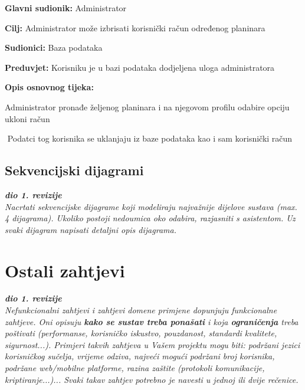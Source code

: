		\noindent {}
		\begin{packed_item}
			
			\item \textbf{Glavni sudionik: }$ $Administrator$ $
			\item  \textbf{Cilj:} $ $Administrator može izbrisati korisnički račun određenog planinara $ $
			\item  \textbf{Sudionici:} $ $Baza podataka $ $
			\item  \textbf{Preduvjet:} $ $Korisniku je u bazi podataka dodjeljena uloga administratora$ $
			\item  \textbf{Opis osnovnog tijeka:}
			
			\item[] \begin{packed_enum}
				
				\item $ $Administrator pronađe željenog planinara i na njegovom profilu odabire opciju ukloni račun$ $
				\item $ $ Podatci tog korisnika se uklanjaju iz baze podataka kao i sam korisnički račun $ $
				
				
			\end{packed_enum}
		\end{packed_item}
				
			\subsection{Sekvencijski dijagrami}
				
				\textbf{\textit{dio 1. revizije}}\\
				
				\textit{Nacrtati sekvencijske dijagrame koji modeliraju najvažnije dijelove sustava (max. 4 dijagrama). Ukoliko postoji nedoumica oko odabira, razjasniti s asistentom. Uz svaki dijagram napisati detaljni opis dijagrama.}
				\eject
	
		\section{Ostali zahtjevi}
		
			\textbf{\textit{dio 1. revizije}}\\
		 
			 \textit{Nefunkcionalni zahtjevi i zahtjevi domene primjene dopunjuju funkcionalne zahtjeve. Oni opisuju \textbf{kako se sustav treba ponašati} i koja \textbf{ograničenja} treba poštivati (performanse, korisničko iskustvo, pouzdanost, standardi kvalitete, sigurnost...). Primjeri takvih zahtjeva u Vašem projektu mogu biti: podržani jezici korisničkog sučelja, vrijeme odziva, najveći mogući podržani broj korisnika, podržane web/mobilne platforme, razina zaštite (protokoli komunikacije, kriptiranje...)... Svaki takav zahtjev potrebno je navesti u jednoj ili dvije rečenice.}
			 
			 
			 
	